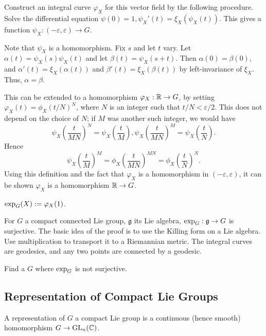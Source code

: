 Construct an integral curve  $\varphi_X$ for this vector field by the following 
procedure. Solve the  differential equation
$\psi(0) = 1, \psi_X'(t)
= \xi_X(\psi_X(t))$. This gives a 
function $\psi_X : (-\varepsilon, \varepsilon) \rightarrow G$.

Note that $\psi_X$ is a homomorphism. Fix $s$ and let $t$ vary. Let
$\alpha(t) = \psi_X(s) \psi_X(t)$ and let $\beta(t) = \psi_X(s + t)$. Then
$\alpha(0) = \beta(0)$, and $\alpha'(t) = \xi_X(\alpha(t))$ and
$\beta'(t) = \xi_X(\beta(t))$ by left-invariance of $\xi_X$. Thus,
$\alpha = \beta$.

This can be extended to a homomorphism $\varphi_X : \mathbb{R} \rightarrow G$,
by setting $\varphi_X(t) = \phi_X(t/N)^N$, where $N$ is an integer such that
$t/N < \varepsilon/2$. This does not depend on the choice of $N$; if $M$ was
another such integer, we would have
\[ \psi_X\left(\dfrac{t}{MN}\right)^N = \psi_X\left(\dfrac{t}{M}\right), 
  \psi_X\left(\dfrac{t}{MN}\right)^M = \psi_X\left(\dfrac{t}{N}\right). \]
Hence \[ \psi_X\left(\dfrac{t}{M}\right)^M = \phi_X(\dfrac{t}{MN})^{MN}
 = \phi_X\left(\dfrac{t}{N}\right)^N. \]
Using this definition and the fact that $\varphi_X$ is a homomorphism in
$(-\varepsilon, \varepsilon)$, it can be shown $\varphi_X$ is a homomorphism
$\mathbb{R} \rightarrow G$.

\begin{defn}
$\operatorname{exp}_G(X) := \varphi_X(1)$.
\end{defn}

\begin{rmk}
For $G$ a compact connected Lie group, $\mathfrak{g}$ its Lie algebra,
$\operatorname{exp}_G: \mathfrak{g} \rightarrow G$ is surjective. The basic idea of the
proof is to use the Killing form on a Lie algebra. Use multiplication to 
transport it to a Riemannian metric. The integral curves are geodesics, and any
two points are connected by a geodesic.
\end{rmk}

\begin{ex}
Find a $G$ where $\operatorname{exp}_G$ is not surjective.
\end{ex}

\subsection{Representation of Compact Lie Groups}

\begin{defn}
A representation of $G$ a compact Lie group is a continuous (hence smooth)
homomorphism $G \rightarrow \mathrm{GL}_{n}({\mathbb{C}})$.
\end{defn}

